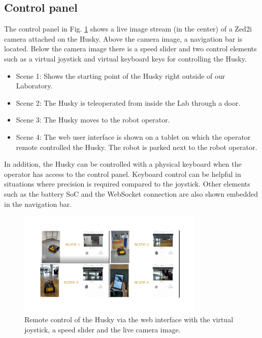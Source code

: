 \documentclass[letterpaper, 10 pt, conference]{ieeeconf}  %
\begin{document}
\subsection{Control panel}
The control panel in Fig. \ref{fig:clip} shows a live image stream (in the center) of a Zed2i camera attached on the Husky. Above the camera image, a navigation bar is located. 
Below the camera image there is a speed slider and two control elements such as a virtual joystick and virtual keyboard keys for controlling the Husky.
\begin{itemize}
    \item Scene 1: Shows the starting point of the Husky right outside of our Laboratory. 
    \item Scene 2: The Husky is teleoperated from inside the Lab through a door.
    \item Scene 3: The Husky moves to the robot operator.
    \item Scene 4: The web user interface is shown on a tablet on which the operator remote controlled the Husky. The robot is parked next to the robot operator.
\end{itemize} 
In addition, the Husky can be controlled with a physical keyboard when the operator has access to the control panel. Keyboard control can be helpful in situations where precision is required compared to the joystick.
Other elements such as the battery SoC and the WebSocket connection are also shown embedded in the navigation bar.

\begin{figure}[b]
    \centerline{\includegraphics[width=8.9cm]{images/clip.pdf}}
    \caption{Remote control of the Husky via the web interface with the virtual joystick, a speed slider and the live camera image.}
    \label{fig:clip}
\end{figure}

\end{document}

